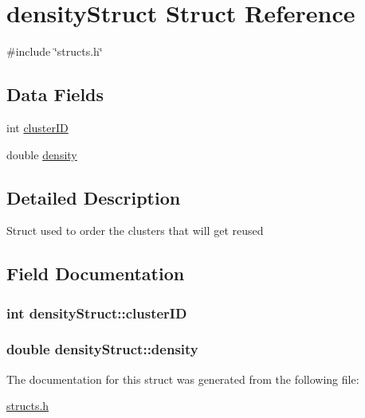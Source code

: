 \hypertarget{structdensityStruct}{\section{density\-Struct Struct Reference}
\label{structdensityStruct}
}


{\ttfamily \#include \char`\"{}structs.\-h\char`\"{}}

\subsection*{Data Fields}
\begin{DoxyCompactItemize}
\item 
int \hyperlink{structdensityStruct_a7c209b566dfbfd5a064658f685b9a03b}{cluster\-I\-D}
\item 
double \hyperlink{structdensityStruct_a573f3fc839f723b35b89c0e553b1e14d}{density}
\end{DoxyCompactItemize}


\subsection{Detailed Description}
Struct used to order the clusters that will get reused 

\subsection{Field Documentation}
\hypertarget{structdensityStruct_a7c209b566dfbfd5a064658f685b9a03b}{
\subsubsection[{cluster\-I\-D}]{\setlength{\rightskip}{0pt plus 5cm}int density\-Struct\-::cluster\-I\-D}}\label{structdensityStruct_a7c209b566dfbfd5a064658f685b9a03b}
\hypertarget{structdensityStruct_a573f3fc839f723b35b89c0e553b1e14d}{
\subsubsection[{density}]{\setlength{\rightskip}{0pt plus 5cm}double density\-Struct\-::density}}\label{structdensityStruct_a573f3fc839f723b35b89c0e553b1e14d}


The documentation for this struct was generated from the following file\-:\begin{DoxyCompactItemize}
\item 
\hyperlink{structs_8h}{structs.\-h}\end{DoxyCompactItemize}
